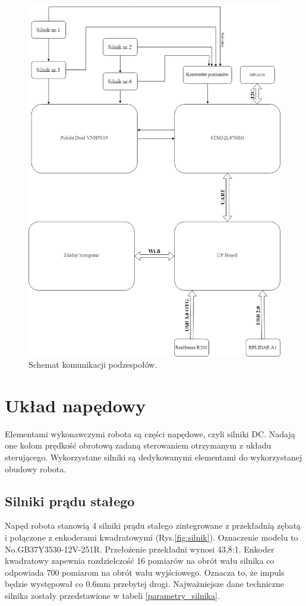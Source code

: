 \begin{figure}[!ht]
	\centering
	\includegraphics[scale=0.5]{schemat.png}
	\caption{Schemat komunikacji podzespołów.}
	\label{fig:schemat}
\end{figure}


\section{Układ napędowy}
Elementami wykonawczymi robota są części napędowe, czyli silniki DC. Nadają one kołom prędkość obrotową zadaną sterowaniem otrzymanym z układu sterującego. Wykorzystane silniki są dedykowanymi elementami do wykorzystanej obudowy robota.
\subsection{Silniki prądu stałego}

Napęd robota stanowią 4 silniki prądu stałego zintegrowane z przekładnią zębatą  i połączone z enkoderami kwadratowymi (Rys.\ref{fig:silnik}). Oznaczenie modelu to No.GB37Y3530-12V-251R. Przełożenie przekładni wynosi 43,8:1. Enkoder kwadratowy zapewnia rozdzielczość 16 pomiarów na obrót wału silnika co odpowiada 700 pomiarom na obrót wału wyjściowego. Oznacza to, że impuls będzie występował co 0.6mm przebytej drogi. Najważniejsze dane techniczne silnika zostały przedstawione w tabeli \ref{parametry_silnika}.


